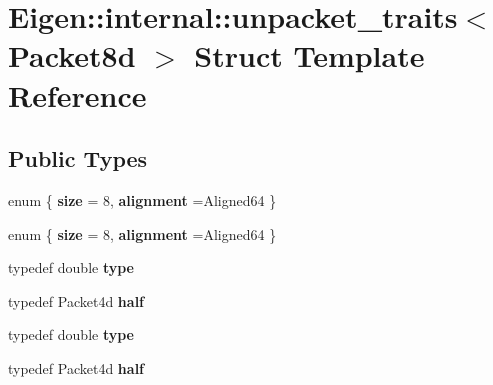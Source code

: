 \hypertarget{struct_eigen_1_1internal_1_1unpacket__traits_3_01_packet8d_01_4}{}\section{Eigen\+:\+:internal\+:\+:unpacket\+\_\+traits$<$ Packet8d $>$ Struct Template Reference}
\label{struct_eigen_1_1internal_1_1unpacket__traits_3_01_packet8d_01_4}
\subsection*{Public Types}
\begin{DoxyCompactItemize}
\item 
\mbox{\label{struct_eigen_1_1internal_1_1unpacket__traits_3_01_packet8d_01_4_a827cf3a1cb11d35b566cbd594a9550dc}} 
enum \{ {\bfseries size} = 8, 
{\bfseries alignment} =Aligned64
 \}
\item 
\mbox{\label{struct_eigen_1_1internal_1_1unpacket__traits_3_01_packet8d_01_4_abad4b31ffad81ed382458bd5db7278e3}} 
enum \{ {\bfseries size} = 8, 
{\bfseries alignment} =Aligned64
 \}
\item 
\mbox{\label{struct_eigen_1_1internal_1_1unpacket__traits_3_01_packet8d_01_4_ad8998aa524d7c65fa3f32ad74096cdbd}} 
typedef double {\bfseries type}
\item 
\mbox{\label{struct_eigen_1_1internal_1_1unpacket__traits_3_01_packet8d_01_4_ad8869b0890be804d26141d36b90aadcc}} 
typedef Packet4d {\bfseries half}
\item 
\mbox{\label{struct_eigen_1_1internal_1_1unpacket__traits_3_01_packet8d_01_4_ad8998aa524d7c65fa3f32ad74096cdbd}} 
typedef double {\bfseries type}
\item 
\mbox{\label{struct_eigen_1_1internal_1_1unpacket__traits_3_01_packet8d_01_4_ad8869b0890be804d26141d36b90aadcc}} 
typedef Packet4d {\bfseries half}
\end{DoxyCompactItemize}


